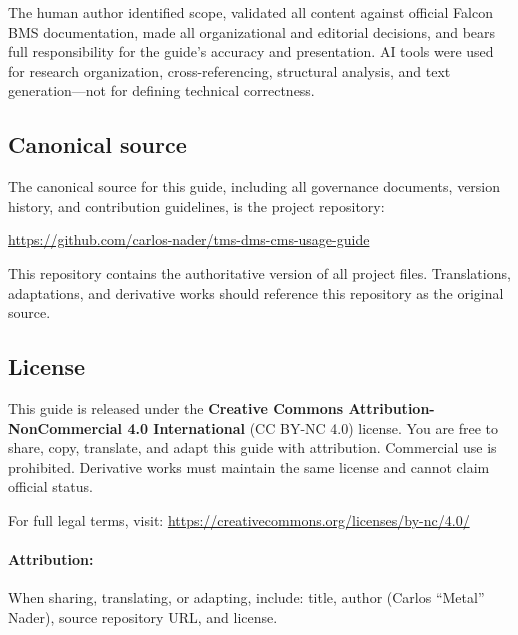 \documentclass[11pt, a4paper, twoside]{report}
\begin{document}
The human author identified scope, validated all content against official Falcon BMS documentation, made all organizational and editorial decisions, and bears full responsibility for the guide's accuracy and presentation. AI tools were used for research organization, cross-referencing, structural analysis, and text generation---not for defining technical correctness.

\subsection{Canonical source}
\label{sec:C1-S4-S3}

The canonical source for this guide, including all governance documents, version history, and contribution guidelines, is the project repository:

\begin{center}
\url{https://github.com/carlos-nader/tms-dms-cms-usage-guide}
\end{center}

This repository contains the authoritative version of all project files. Translations, adaptations, and derivative works should reference this repository as the original source.

\subsection{License}
\label{sec:C1-S4-S4}

This guide is released under the \textbf{Creative Commons Attribution-NonCommercial 4.0 International} (CC BY-NC 4.0) license. You are free to share, copy, translate, and adapt this guide with attribution. Commercial use is prohibited. Derivative works must maintain the same license and cannot claim official status.

For full legal terms, visit: \url{https://creativecommons.org/licenses/by-nc/4.0/}

\paragraph{Attribution:}
When sharing, translating, or adapting, include: title, author (Carlos ``Metal'' Nader), source repository URL, and license.
\end{document}
